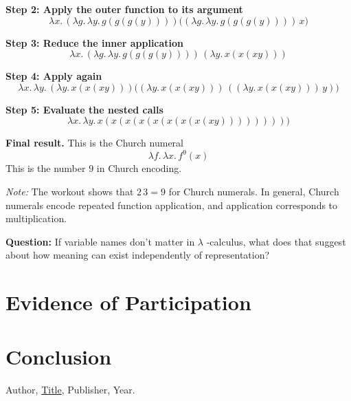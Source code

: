 \documentclass{article}
\theoremstyle{theorem}
\theoremstyle{definition}
\theoremstyle{remark}
\begin{document}
\noindent
\textbf{Step 2: Apply the outer function to its argument}
\[
\lambda x.\, (\lambda g.\,\lambda y.\, g(g(g(y)))) \big( (\lambda g.\,\lambda y.\, g(g(g(y))))\, x \big)
\]

\noindent
\textbf{Step 3: Reduce the inner application}
\[
\lambda x.\, (\lambda g.\,\lambda y.\, g(g(g(y)))) \, (\lambda y.\, x(x(xy)))
\]

\noindent
\textbf{Step 4: Apply again}
\[
\lambda x.\,\lambda y.\, (\lambda y.\, x(x(xy))) \big((\lambda y.\, x(x(xy))) \, ((\lambda y.\, x(x(xy)))\, y)\big)
\]

\noindent
\textbf{Step 5: Evaluate the nested calls}
\[
\lambda x.\,\lambda y.\, x(x(x(x(x(x(x(x(xy)))))))))
\]

\noindent
\textbf{Final result.} This is the Church numeral
\[
\lambda f.\,\lambda x.\, f^9(x)
\]
This is the number $9$ in Church encoding.

\medskip
\noindent
\emph{Note:} The workout shows that $2\,3 = 9$ for Church numerals. In general, Church numerals encode repeated function application, and application corresponds to multiplication.

\textbf{Question:} If variable names don’t matter in $\lambda$
-calculus, what does that suggest about how meaning can exist independently of representation?

\section{Evidence of Participation}

\section{Conclusion}\label{conclusion}

\begin{thebibliography}{99}
 Author, \href{https://en.wikipedia.org/wiki/LaTeX}{Title}, Publisher, Year.
\end{thebibliography}
\end{document}

